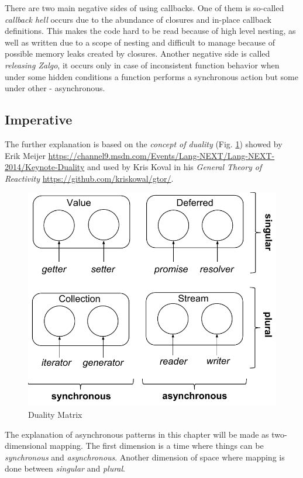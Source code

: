 There are two main negative sides of using callbacks. One of them is so-called \textit{callback hell} occurs due to the abundance of closures and in-place callback definitions. This makes the code hard to be read because of high level nesting, as well as written due to a scope of nesting and difficult to manage because of possible memory leaks created by closures. Another negative side is called \textit{releasing Zalgo}\cite{zalgo}, it occurs only in case of inconsistent function behavior when under some hidden conditions a function performs a synchronous action but some under other - asynchronous.

\subsection{Imperative}
The further explanation is based on the \textit{concept of duality} (Fig. \ref{fig:dualityMatrix}) showed by Erik Meijer \url{https://channel9.msdn.com/Events/Lang-NEXT/Lang-NEXT-2014/Keynote-Duality} and used by Kris Koval in his \textit{General Theory of Reactivity} \url{https://github.com/kriskowal/gtor/}.

\begin{figure}[ht]
	\label{fig:dualityMatrix}
	\centering
	\includegraphics[scale = 0.5]{grafiken/dualityMatrix}
	\caption{Duality Matrix \cite{gtor}}
\end{figure}

The explanation of asynchronous patterns in this chapter will be made as two-dimensional mapping. The first dimension is a time where things can be \textit{synchronous} and \textit{asynchronous}. Another dimension of space where mapping is done between \textit{singular} and \textit{plural}.

